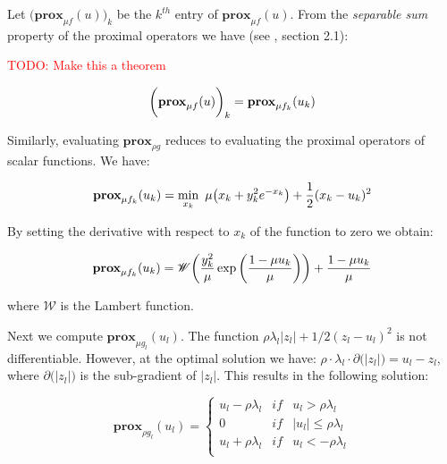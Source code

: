 \documentclass{article}
\newcommand{\attn}[1]{\textcolor{red}{TODO: #1}}
\begin{document}
Let $\big(\textbf{prox}_{\mu f}(u)\big)_k$ be the $k^{th}$ entry of $\textbf{prox}_{\mu f}(u)$. From the \textit{separable sum} property of the proximal operators we have (see \citep{parikh_proximal_2014}, section 2.1):

\attn{Make this a theorem}

\begin{equation}
\bigg(\textbf{prox}_{\mu f}(u)\bigg)_k = \textbf{prox}_{\mu f_k}(u_k)\\
\label{eq:linADMM_sepSum}
\end{equation}

Similarly, evaluating $\textbf{prox}_{\rho g}$ reduces to evaluating the proximal operators of scalar functions. We have:

\begin{equation}
\textbf{prox}_{\mu f_k}(u_k)=\min_{x_k} \,\, \mu\big(x_k+y_{k}^2e^{-x_{k}}\big)+\frac{1}{2}  (x_k-u_k)^2\\
\label{eq:linADMM_proxf}
\end{equation}

By setting the derivative with respect to $x_k$ of the function to zero we obtain:

\begin{equation}
\textbf{prox}_{\mu f_k}(u_k)=\mathscr{W}\bigg(\frac{y_k^2}{\mu} \exp\bigg(\frac{1-\mu u_k}{\mu}\bigg) \bigg) + \frac{1-\mu u_k}{\mu}\\
\label{eq:linADMM_proxf_sol}
\end{equation}

where $\mathscr{W}$ is the Lambert function.

Next we compute $\textbf{prox}_{\mu g_l}(u_l)$. The function $\rho \lambda_l |z_l|+1/2(z_l-u_l)^2$ is not differentiable. However, at the optimal solution we have: $\rho \cdot \lambda_l \cdot \partial \big(|z_l| \big)=u_l-z_l$, where $\partial \big(|z_l| \big)$ is the sub-gradient of $|z_l|$. This results in the following solution:

\begin{equation}
\textbf{prox}_{\rho g_l}(u_l)=\left\{\begin{matrix}
 u_l-\rho \lambda_l  & if &  u_l>\rho \lambda_l\\ 
 0  \,\,\,\,\,  & if &  |u_l|\le \rho \lambda_l\\ 
 u_l+\rho \lambda_l  &  if &  u_l<-\rho \lambda_l\\ 

\end{matrix}\right.
\label{eq:linADMM_proxg_sol}
\end{equation}
\end{document}
